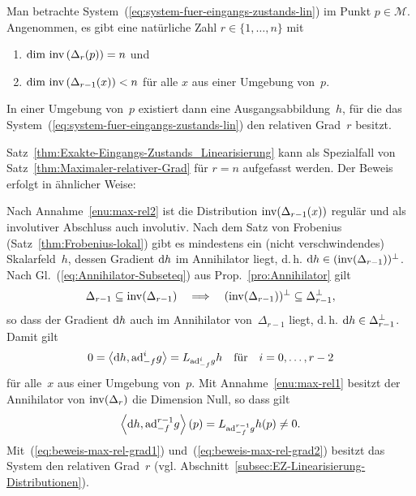 \begin{theorem}
\label{thm:Maximaler-relativer-Grad}Man betrachte System~(\ref{eq:system-fuer-eingangs-zustands-lin})
im Punkt $p\in\mathcal{M}$. Angenommen, es gibt eine natürliche Zahl
$r\in\{1,\ldots,n\}$ mit
\begin{enumerate}
\item \label{enu:max-rel1}$\dim\,{\operatorname{inv}}\left(\Delta_{r}(p)\right)=n$ und
\item \label{enu:max-rel2}$\dim\,{\operatorname{inv}}\left(\Delta_{r-1}(x)\right)<n$ für
alle $x$ aus einer Umgebung von~$p$.
\end{enumerate}
In einer Umgebung von~$p$ existiert dann eine Ausgangsabbildung~$h$,
für die das System~(\ref{eq:system-fuer-eingangs-zustands-lin})
den relativen Grad~$r$ besitzt.
\end{theorem}
Satz~\ref{thm:Exakte-Eingangs-Zustands_Linearisierung} kann als
Spezialfall von Satz~\ref{thm:Maximaler-relativer-Grad} für $r=n$
aufgefasst werden. Der Beweis erfolgt in ähnlicher Weise:
\begin{svmultproof2}
Nach Annahme~\ref{enu:max-rel2} ist die Distribution
${\operatorname{inv}}(\Delta_{r-1}(x))$ regulär und als involutiver Abschluss
auch involutiv. Nach dem Satz von Frobenius (Satz~\ref{thm:Frobenius-lokal})
gibt es mindestens ein (nicht verschwindendes) Skalarfeld~$h$, dessen
Gradient ${\mathrm{d}} h$ im Annihilator liegt, d.\,h. ${\mathrm{d}} h\in({\operatorname{inv}}(\Delta_{r-1}))^{\perp}$.
Nach Gl.~(\ref{eq:Annihilator-Subseteq}) aus Prop.~\ref{pro:Annihilator}
gilt 
\[
\Delta_{r-1}\subseteq{\operatorname{inv}}(\Delta_{r-1})\quad\Longrightarrow\quad({\operatorname{inv}}(\Delta_{r-1}))^{\perp}\subseteq\Delta_{r-1}^{\perp},
\]
so dass der Gradient ${\mathrm{d}} h$ auch im Annihilator von~$\Delta_{r-1}$
liegt, d.\,h. ${\mathrm{d}} h\in\Delta_{r-1}^{\perp}$. Damit gilt 
\begin{equation}
0=\left\langle {\mathrm{d}} h,{\operatorname{ad}}_{-f}^{i}g\right\rangle =L_{{\operatorname{ad}}_{-f}^{i}g}h\quad\text{für}\quad i=0,\ldots,r-2\label{eq:beweis-max-rel-grad1}
\end{equation}
für alle~$x$ aus einer Umgebung von~$p$. Mit Annahme~\ref{enu:max-rel1}
besitzt der Annihilator von ${\operatorname{inv}}(\Delta_{r})$ die Dimension Null,
so dass gilt
\begin{equation}
\left\langle {\mathrm{d}} h,{\operatorname{ad}}_{-f}^{r-1}g\right\rangle (p)=L_{{\operatorname{ad}}_{-f}^{r-1}g}h(p)\neq0.\label{eq:beweis-max-rel-grad2}
\end{equation}
Mit~(\ref{eq:beweis-max-rel-grad1}) und~(\ref{eq:beweis-max-rel-grad2})
besitzt das System den relativen Grad~$r$ (vgl. Abschnitt~\ref{subsec:EZ-Linearisierung-Distributionen}).
\end{svmultproof2}

